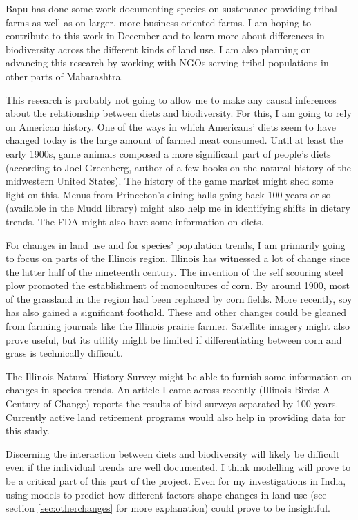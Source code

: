 \documentclass[report.tex]{subfiles}
\begin{document}
Bapu has done some work documenting species on sustenance providing tribal farms as well as on larger, more business oriented farms. I am hoping to contribute to this work in December and to learn more about differences in biodiversity across the different kinds of land use. I am also planning on advancing this research by working with NGOs serving tribal populations in other parts of Maharashtra.

This research is probably not going to allow me to make any causal inferences about the relationship between diets and biodiversity. For this, I am going to rely on American history. One of the ways in which Americans' diets seem to have changed today is the large amount of farmed meat consumed. Until at least the early 1900s, game animals composed a more significant part of people's diets (according to Joel Greenberg, author of a few books on the natural history of the midwestern United States). The history of the game market might shed some light on this. Menus from Princeton's dining halls going back 100 years or so (available in the Mudd library) might also help me in identifying shifts in dietary trends. The FDA might also have some information on diets.

For changes in land use and for species' population trends, I am primarily going to focus on parts of the Illinois region. Illinois has witnessed a lot of change since the latter half of the nineteenth century. The invention of the self scouring steel plow promoted the establishment of monocultures of corn. By around 1900, most of the grassland in the region had been replaced by corn fields. More recently, soy has also gained a significant foothold. These and other changes could be gleaned from farming journals like the Illinois prairie farmer. Satellite imagery might also prove useful, but its utility might be limited if differentiating between corn and grass is technically difficult.

The Illinois Natural History Survey might be able to furnish some information on changes in species trends. An article I came across recently (Illinois Birds: A Century of Change) reports the results of bird surveys separated by 100 years. Currently active land retirement programs would also help in providing data for this study.

Discerning the interaction between diets and biodiversity will likely be difficult even if the individual trends are well documented. I think modelling will prove to be a critical part of this part of the project. Even for my investigations in India, using models to predict how different factors shape changes in land use (see section \ref{sec:otherchanges} for more explanation) could prove to be insightful.
\end{document}
